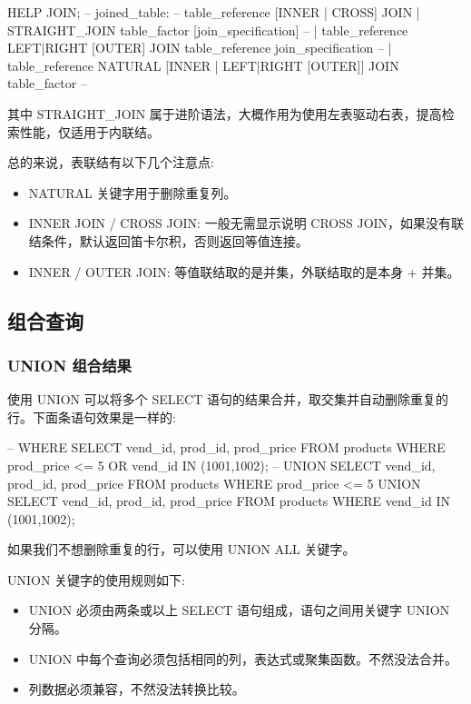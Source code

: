 \begin{sql}
HELP JOIN;
-- joined_table: {
--     table_reference {[INNER | CROSS] JOIN | STRAIGHT_JOIN} table_factor [join_specification]
--   | table_reference {LEFT|RIGHT} [OUTER] JOIN table_reference join_specification
--   | table_reference NATURAL [INNER | {LEFT|RIGHT} [OUTER]] JOIN table_factor
-- }
\end{sql}

其中 STRAIGHT\_JOIN 属于进阶语法，大概作用为使用左表驱动右表，提高检索性能，仅适用于内联结。

总的来说，表联结有以下几个注意点:
\begin{itemize}
    \item NATURAL 关键字用于删除重复列。
    \item INNER JOIN / CROSS JOIN: 一般无需显示说明 CROSS JOIN，如果没有联结条件，默认返回笛卡尔积，否则返回等值连接。
    \item INNER / OUTER JOIN: 等值联结取的是并集，外联结取的是本身 + 并集。
\end{itemize}

\subsection{组合查询}


\subsubsection{UNION 组合结果}

使用 UNION 可以将多个 SELECT 语句的结果合并，取交集并自动删除重复的行。下面条语句效果是一样的:

\begin{sql}
-- WHERE
SELECT vend_id, prod_id, prod_price
    FROM products
    WHERE prod_price <= 5
       OR vend_id IN (1001,1002);
-- UNION
SELECT vend_id, prod_id, prod_price
    FROM products
    WHERE prod_price <= 5
UNION
SELECT vend_id, prod_id, prod_price
    FROM products
    WHERE vend_id IN (1001,1002);
\end{sql}

如果我们不想删除重复的行，可以使用 UNION ALL 关键字。

UNION 关键字的使用规则如下:
\begin{itemize}
    \item UNION 必须由两条或以上 SELECT 语句组成，语句之间用关键字 UNION 分隔。
    \item UNION 中每个查询必须包括相同的列，表达式或聚集函数。不然没法合并。
    \item 列数据必须兼容，不然没法转换比较。
\end{itemize}

